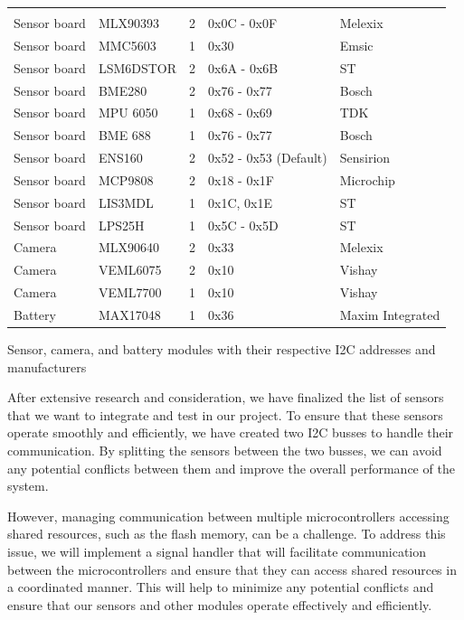 \documentclass[11pt]{article}
\begin{document}
\begin{table}[htbp]
\centering
{} %
\begin{tabular}{>{\centering\arraybackslash}m{3cm}>{\centering\arraybackslash}llll}
\hline
\rowcolor{CDOSRPrimary}
\textbf{\color{white!50}{Module}} & \textbf{\color{white}{Sensor}} & \textbf{\color{white}{I2C Bus}} & \textbf{\color{white}{I2C Address}} & \textbf{\color{white}{Manufacturer}} \\
Sensor board & MLX90393 & 2 & 0x0C - 0x0F & Melexix \\
Sensor board & MMC5603 & 1 & 0x30 & Emsic \\
Sensor board & LSM6DSTOR & 2 & 0x6A - 0x6B & ST \\
Sensor board & BME280 & 2 & 0x76 - 0x77 & Bosch \\
Sensor board & MPU 6050 & 1 & 0x68 - 0x69 & TDK \\
Sensor board & BME 688 & 1 & 0x76 - 0x77 & Bosch \\
Sensor board & ENS160 & 2 & 0x52 - 0x53 (Default) & Sensirion \\
Sensor board & MCP9808 & 2 & 0x18 - 0x1F & Microchip \\
Sensor board & LIS3MDL & 1 & 0x1C, 0x1E & ST \\
Sensor board & LPS25H & 1 & 0x5C - 0x5D & ST \\
Camera & MLX90640 & 2 & 0x33 & Melexix \\
Camera & VEML6075 & 2 & 0x10 & Vishay \\
Camera & VEML7700 & 1 & 0x10 & Vishay \\
Battery & MAX17048 & 1 & 0x36 & Maxim Integrated \\
\end{tabular}
\end{table}
\caption{Sensor, camera, and battery modules with their respective I2C addresses and manufacturers}
\label{tab:sensors}

After extensive research and consideration, we have finalized the list of sensors that we want to integrate and test in our project. To ensure that these sensors operate smoothly and efficiently, we have created two I2C busses to handle their communication. By splitting the sensors between the two busses, we can avoid any potential conflicts between them and improve the overall performance of the system.

However, managing communication between multiple microcontrollers accessing shared resources, such as the flash memory, can be a challenge. To address this issue, we will implement a signal handler that will facilitate communication between the microcontrollers and ensure that they can access shared resources in a coordinated manner. This will help to minimize any potential conflicts and ensure that our sensors and other modules operate effectively and efficiently.
\end{document}

